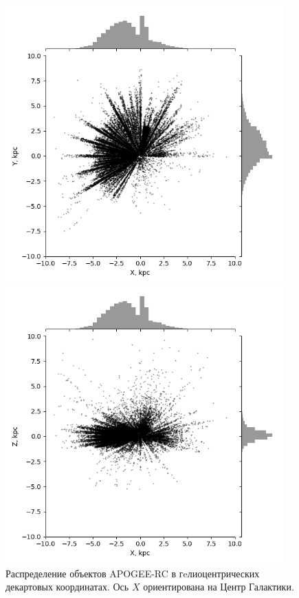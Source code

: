 \documentclass{matmex-diploma-custom}
\begin{document}
\begin{figure}[h!]
\begin{minipage}[h]{0.49\linewidth}
        \includegraphics[width=0.95\textwidth]{../imgs/XYobj.png}
\end{minipage}
\hfill
\begin{minipage}[h]{0.49\linewidth}
        \includegraphics[width=0.95\textwidth]{../imgs/XZobj.png}
\end{minipage}
\caption{Распределение объектов APOGEE-RC в гeлиоцентрических декартовых координатах. Ось $X$ ориентирована на Центр Галактики. }
\end{figure}
\end{document}

